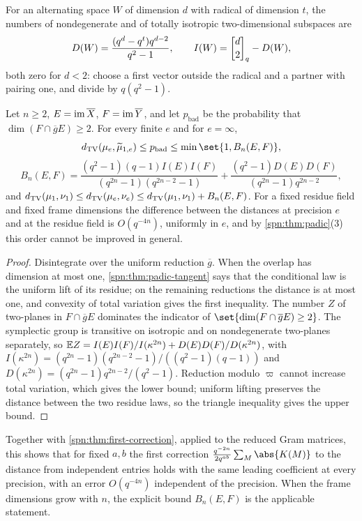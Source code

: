 For an alternating space $W$ of dimension $d$ with radical of dimension $t$, the numbers of
nondegenerate and of totally isotropic two-dimensional subspaces are
\[
 D(W)=\frac{(q^d-q^t)q^{d-2}}{q^2-1},\qquad I(W)=\spnqbin d2q-D(W),
\]
both zero for $d<2$: choose a first vector outside the radical and a partner with pairing one,
and divide by $q(q^2-1)$.

\begin{theorem}\label{spn:thm:padic-lifting}
Let $n\ge2$, $E=\operatorname{im}\overline X$, $F=\operatorname{im}\overline Y$, and let $p_{\mathrm{bad}}$ be the
probability that $\dim(F\cap\overline gE)\ge2$. For every finite $e$ and for $e=\infty$,
\[
 \spnTV(\mu_e,\widetilde\mu_{1,e})\le p_{\mathrm{bad}}\le\min\set{1,B_n(E,F)},
\]
\[
 B_n(E,F)=\frac{(q^2-1)(q-1)I(E)I(F)}{(q^{2n}-1)(q^{2n-2}-1)}+\frac{(q^2-1)D(E)D(F)}{(q^{2n}-1)q^{2n-2}},
\]
and
$d_{\mathrm{TV}}(\mu_1,\nu_1)\le d_{\mathrm{TV}}(\mu_e,\nu_e)\le d_{\mathrm{TV}}(\mu_1,\nu_1)+B_n(E,F)$. For a fixed residue
field and fixed frame dimensions the difference between the distances at precision $e$ and at the
residue field is $O(q^{-4n})$, uniformly in $e$, and by \cref{spn:thm:padic}(3) this order cannot
be improved in general.
\end{theorem}

\begin{proof}
Disintegrate over the uniform reduction $\overline g$. When the overlap has dimension at most one,
\cref{spn:thm:padic-tangent} says that the conditional law is the uniform lift of its residue; on
the remaining reductions the distance is at most one, and convexity of total variation gives the
first inequality. The number $Z$ of two-planes in $F\cap\overline gE$ dominates the indicator of
$\set{\dim(F\cap\overline gE)\ge2}$. The symplectic group is transitive on isotropic and on
nondegenerate two-planes separately, so $\mathbb{E} Z=I(E)I(F)/I(\kappa^{2n})+D(E)D(F)/D(\kappa^{2n})$, with
$I(\kappa^{2n})=(q^{2n}-1)(q^{2n-2}-1)/((q^2-1)(q-1))$ and $D(\kappa^{2n})=(q^{2n}-1)q^{2n-2}/(q^2-1)$.
Reduction modulo $\varpi$ cannot increase total variation, which gives the lower bound;
uniform lifting preserves the distance between the two residue laws, so the triangle inequality
gives the upper bound.
\end{proof}

Together with \cref{spn:thm:first-correction}, applied to the reduced Gram matrices, this shows
that for fixed $a,b$ the first correction $\frac{q^{-2n}}{2q^{ab}}\sum_M\abs{K(M)}$ to the distance
from independent entries holds with the same leading coefficient at every precision, with an error
$O(q^{-4n})$ independent of the precision. When the frame dimensions grow with $n$, the explicit
bound $B_n(E,F)$ is the applicable statement.

